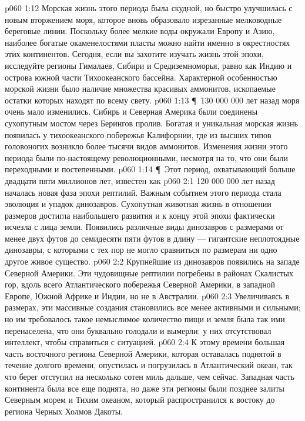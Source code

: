 \vs p060 1:12 Морская жизнь этого периода была скудной, но быстро улучшилась с новым вторжением моря, которое вновь образовало изрезанные мелководные береговые линии. Поскольку более мелкие воды окружали Европу и Азию, наиболее богатые окаменелостями пласты можно найти именно в окрестностях этих континентов. Сегодня, если вы захотите изучать жизнь этой эпохи, исследуйте регионы Гималаев, Сибири и Средиземноморья, равно как Индию и острова южной части Тихоокеанского бассейна. Характерной особенностью морской жизни было наличие множества красивых аммонитов, ископаемые остатки которых находят по всему свету.
\vs p060 1:13 \P\ 130 000 000 лет назад моря очень мало изменились. Сибирь и Северная Америка были соединены сухопутным мостом через Берингов пролив. Богатая и уникальная морская жизнь появилась у тихоокеанского побережья Калифорнии, где из высших типов головоногих возникло более тысячи видов аммонитов. Изменения жизни этого периода были по\hyp{}настоящему революционными, несмотря на то, что они были переходными и постепенными.
\vs p060 1:14 \P\ Этот период, охватывающий больше двадцати пяти миллионов лет, известен как 
\vs p060 2:1 120 000 000 лет назад началась новая фаза эпохи рептилий. Важным событием этого периода стала эволюция и упадок динозавров. Сухопутная животная жизнь в отношении размеров достигла наибольшего развития и к концу этой эпохи фактически исчезла с лица земли. Появились различные виды динозавров с размерами от менее двух футов до семидесяти пяти футов в длину --- гигантские неплотоядные динозавры, с которыми с тех пор не могло сравниться по размерам ни одно другое живое существо.
\vs p060 2:2 Крупнейшие из динозавров появились на западе Северной Америки. Эти чудовищные рептилии погребены в районах Скалистых гор, вдоль всего Атлантического побережья Северной Америки, в западной Европе, Южной Африке и Индии, но не в Австралии.
\vs p060 2:3 Увеличиваясь в размерах, эти массивные создания становились все менее активными и сильными; но им требовалось такое немыслимое количество пищи и земля была так ими перенаселена, что они буквально голодали и вымерли: у них отсутствовал интеллект, чтобы справиться с ситуацией.
\vs p060 2:4 К этому времени большая часть восточного региона Северной Америки, которая оставалась поднятой в течение долгого времени, опустилась и погрузилась в Атлантический океан, так что берег отступил на несколько сотен миль дальше, чем сейчас. Западная часть континента была все еще поднята, но даже эти регионы были позднее залиты Северным морем и Тихим океаном, который распространился к востоку до региона Черных Холмов Дакоты.
